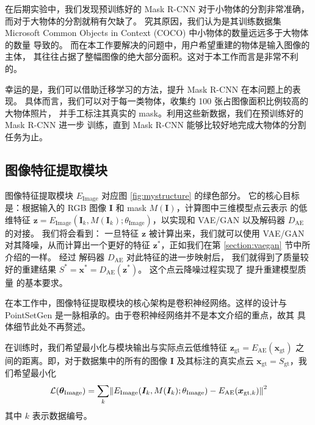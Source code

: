 在后期实验中，我们发现预训练好的 Mask R-CNN 对于小物体的分割非常准确，而对于大物体的分割就稍有欠缺了。%
究其原因，我们认为是其训练数据集%
Microsoft Common Objects in Context (COCO) \cite{coco} 中小物体的数量远远多于大物体的数量%
导致的。
而在本工作要解决的问题中，用户希望重建的物体是输入图像的主体，
其往往占据了整幅图像的绝大部分面积。这对于本工作而言是非常不利的。

幸运的是，我们可以借助迁移学习的方法，提升 Mask R-CNN  在本问题上的表现。
具体而言，我们可以对于每一类物体，收集约 100 张占图像面积比例较高的大物体照片，
并手工标注其真实的 mask。利用这些新数据，我们在预训练好的 Mask R-CNN 进一步%
训练，直到 Mask R-CNN 能够比较好地完成大物体的分割任务为止。

\subsection{图像特征提取模块}
图像特征提取模块 $E_{\text{Image}}$ 对应图 \ref{fig:mystructure} 的绿色部分。
它的核心目标是：根据输入的 RGB 图像 $\bm I$ 和 mask $M(\bm I)$，计算图中三维模型点云表示 %
的低维特征 $\bm z = E_{\text{Image}}(\bm I_k, M(\bm I_k); \theta_{\text{Image}})$，以实现和 VAE/GAN\cite{vaegan} 以及解码器 $D_{\text{AE}}$ 的对接。
我们将会看到：
一旦特征 $\bm z$ 被计算出来，我们就可以使用 VAE/GAN 对其降噪，从而计算出一个更好的特征 $\bm z^*$，正如我们在第 \ref{section:vaegan} 节中所介绍的一样。
经过%
解码器 $D_{\text{AE}}$ 对此特征的进一步映射后，%
我们就得到了质量较好的重建结果 $S^* = \bm x^* = D_{\text{AE}}(\bm z^*)$。
这个点云降噪过程实现了%
提升重建模型质量 的基本要求。


在本工作中，图像特征提取模块的核心架构是卷积神经网络。这样的设计与 PointSetGen 是一脉相承的。由于卷积神经网络并不是本文介绍的重点，故其
具体细节此处不再赘述。

在训练时，我们希望最小化与模块输出与实际点云低维特征 $\bm z_{\text{gt}} = E_{\text{AE}}(\bm x_{\text{gt}})$ 之间的距离。即，对于数据集中的所有的图像 $\bm I$ 及其标注的真实点云 $\bm x_{\text{gt}} = S_{\text{gt}}$，我们希望最小化
\begin{align}
	\Loss(\bm \theta_{\text{Image}}) = \sum_k
	\Norm*{E_{\text{Image}}(\bm I_k, M(\bm I_k); \theta_{\text{Image}}) -
		E_{\text{AE}}(\bm x_{\text{gt}, k})}^2
	\label{eq:myimloss}
\end{align}
其中 $k$ 表示数据编号。

